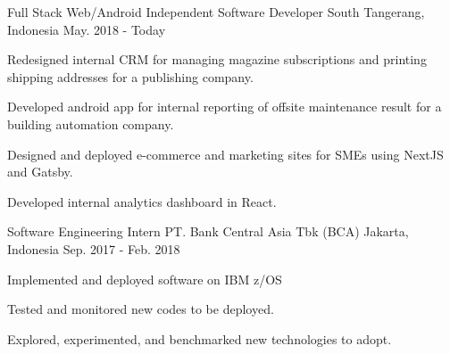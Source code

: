 

\begin{cventries}

  \cventry
  {Full Stack Web/Android} %
  {Independent Software Developer} %
  {South Tangerang, Indonesia} %
  {May. 2018 - Today} %
  {
    \begin{cvitems} %
      \item {Redesigned internal CRM for managing magazine subscriptions and printing shipping addresses for a publishing company.}
      \item {Developed android app for internal reporting of offsite maintenance result for a building automation company.}
      \item {Designed and deployed e-commerce and marketing sites for SMEs using NextJS and Gatsby.}
      \item {Developed internal analytics dashboard in React.}
    \end{cvitems}
  }

  \cventry
  {Software Engineering Intern} %
  {PT. Bank Central Asia Tbk (BCA)} %
  {Jakarta, Indonesia} %
  {Sep. 2017 - Feb. 2018} %
  {
    \begin{cvitems} %
      \item {Implemented and deployed software on IBM z/OS}
      \item {Tested and monitored new codes to be deployed.}
      \item {Explored, experimented, and benchmarked new technologies to adopt.}
    \end{cvitems}
  }

\end{cventries}
